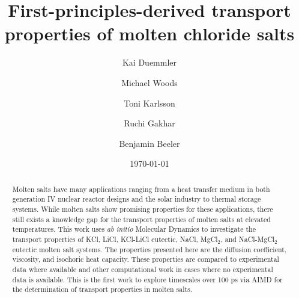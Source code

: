 \documentclass[review]{elsarticle}
\begin{document}
\begin{frontmatter}

\title{First-principles-derived transport properties of molten chloride salts }

\author[ncsu]{Kai Duemmler}
\author[inl]{Michael Woods}
\author[inl]{Toni Karlsson}
\author[inl]{Ruchi Gakhar}

\author[ncsu,inl]{Benjamin Beeler}

\address[ncsu]{North Carolina State University, Raleigh, NC 27695}
\address[inl]{Idaho National Laboratory, Idaho Falls, ID 83415}
\date{\today}

\begin{abstract}
Molten salts have many applications ranging from a heat transfer medium in both generation IV nuclear reactor designs and the solar industry to thermal storage systems. While molten salts show promising properties for these applications, there still exists a knowledge gap for the transport properties of molten salts at elevated temperatures. This work uses \textit{ab initio} Molecular Dynamics to investigate the transport properties of KCl, LiCl, KCl-LiCl eutectic, NaCl, MgCl$_{2}$, and NaCl-MgCl$_2$ eutectic molten salt systems. The properties presented here are the diffusion coefficient, viscosity, and isochoric heat capacity. These properties are compared to experimental data where available and other computational work in cases where no experimental data is available. This is the first work to explore timescales over 100 ps via AIMD for the determination of transport properties in molten salts.
\end{abstract}

\end{frontmatter}

\end{document}

